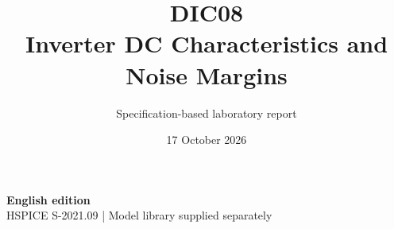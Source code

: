 \documentclass[11pt,a4paper]{article}
\title{\color{accent}DIC08\\[4pt]Inverter DC Characteristics and Noise Margins}
\author{Specification-based laboratory report}
\date{17 October 2026}
\begin{document}
\maketitle
\begin{center}\small\textbf{English edition}\\
HSPICE S-2021.09 \quad | \quad Model library supplied separately
\end{center}


\end{document}
